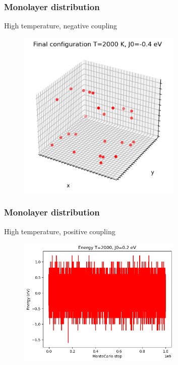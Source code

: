 \documentclass{beamer}
\begin{document}
\begin{frame}
    \frametitle{Monolayer distribution}

    \centering High temperature, negative coupling

    \begin{figure}
        \includegraphics[width=0.7\textwidth]{images/erocco6.png}
    \end{figure}

\end{frame}
\begin{frame}
    \frametitle{Monolayer distribution}

    \centering High temperature, positive coupling

    \begin{figure}
        \includegraphics[width=0.7\textwidth]{images/erocco7.png}
    \end{figure}

\end{frame}
\end{document}
